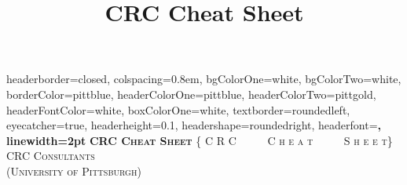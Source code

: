 \documentclass[landscape,a0paper,fontscale=0.285]{baposter} %
\title{CRC Cheat Sheet}
\begin{document}
\begin{poster}
{
 headerborder=closed, %
 colspacing=0.8em, %
 bgColorOne=white, %
 bgColorTwo=white, %
 borderColor=pittblue, %
 headerColorOne=pittblue, %
 headerColorTwo=pittgold, %
 headerFontColor=white, %
 boxColorOne=white, %
 textborder=roundedleft, %
 eyecatcher=true, %
 headerheight=0.1\textheight, %
 headershape=roundedright, %
 headerfont=\Large\bf\textsc, %
 linewidth=2pt %
}
{\bf\textsc{CRC Cheat Sheet}\vspace{0.5em}} %
{\textsc{\{ C R C \ \ \ \ \ C h e a t \ \ \ \ \ S h e e t\} \hspace{12pt}}}
{\textsc{CRC Consultants \\ (University of Pittsburgh) \hspace{12pt}}} 

\end{poster}
\end{document}

